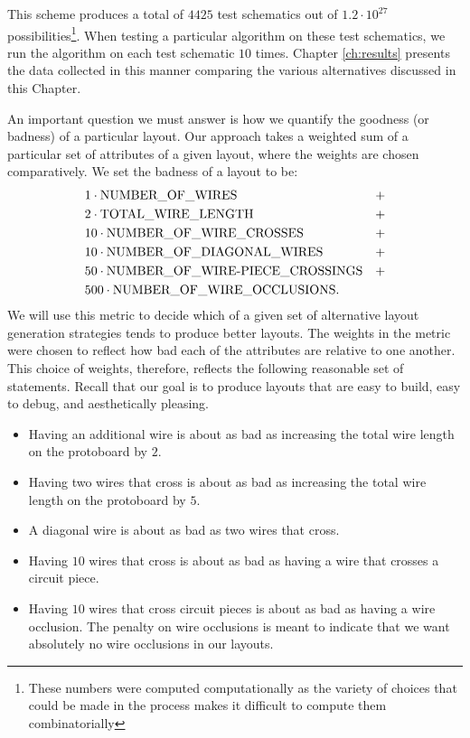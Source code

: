 This scheme produces a total of $4425$ test schematics out of $1.2\cdot10^{27}$
possibilities\footnote{These numbers were computed computationally as the
variety of choices that could be made in the process makes it difficult to
compute them combinatorially}.
When testing a particular algorithm on these test
schematics, we run the algorithm on each test schematic $10$ times. Chapter
\ref{ch:results} presents the data collected in this manner comparing the
various alternatives discussed in this Chapter.

An important question we must answer is how we quantify the goodness (or badness)
of a particular layout. Our approach takes a weighted sum of a particular set of
attributes of a given layout, where the weights are chosen comparatively. We set
the badness of a layout to be:
\begin{align*}
\centering
&1 \cdot \text{NUMBER\_OF\_WIRES} &+ \\
&2 \cdot \text{TOTAL\_WIRE\_LENGTH} &+ \\
&10 \cdot \text{NUMBER\_OF\_WIRE\_CROSSES} &+ \\
&10 \cdot \text{NUMBER\_OF\_DIAGONAL\_WIRES} &+ \\
&50 \cdot \text{NUMBER\_OF\_WIRE-PIECE\_CROSSINGS} &+ \\
&500 \cdot \text{NUMBER\_OF\_WIRE\_OCCLUSIONS}.
\end{align*}
We will use this metric to decide which of a given set of alternative
layout generation strategies tends to produce better layouts.
The weights in the metric were chosen to reflect how
bad each of the attributes are relative to one another. This choice of weights,
therefore, reflects the following reasonable set of statements. Recall that our
goal is to produce layouts that are easy to build, easy to debug, and
aesthetically pleasing.
\begin{itemize}
\item Having an additional wire is about as bad as increasing the total wire
length on the protoboard by $2$.
\item Having two wires that cross is about as bad as increasing the total
wire length on the protoboard by $5$.
\item A diagonal wire is about as bad as two wires that cross.
\item Having $10$ wires that cross is about as bad as having a wire that
crosses a circuit piece.
\item Having $10$ wires that cross circuit pieces is about as bad as having a
wire occlusion. The penalty on wire occlusions is meant to indicate that we want
absolutely no wire occlusions in our layouts.
\end{itemize}
